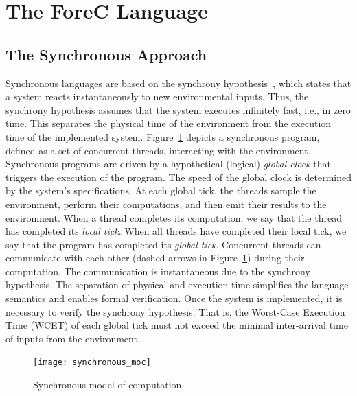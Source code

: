 \section{The ForeC Language}
\label{sec:forecLanguage}


\subsection{The Synchronous Approach}
Synchronous languages are based on the synchrony hypothesis~\cite{timed_synchronous_survey},
which states that a system reacts instantaneously to new environmental
inputs. Thus, the synchrony hypothesis assumes that the system 
executes infinitely fast, i.e., in zero time. This separates the physical 
time of the environment from the execution time of the implemented system. 
Figure~\ref{fig:synchronous_moc} depicts a synchronous 
program, defined as a set of concurrent threads, interacting with the 
environment. Synchronous programs are driven by a hypothetical (logical)
\emph{global clock} that triggers the execution of the program. The speed 
of the global clock is determined by the system's specifications. At each
global tick, the threads sample the environment, perform their computations,
and then emit their results to the environment. When a thread completes 
its computation, we say that the thread has completed its \emph{local tick}.
When all threads have completed their local tick, we say that the program
has completed its \emph{global tick}.
Concurrent threads can communicate with each other (dashed 
arrows in Figure~\ref{fig:synchronous_moc}) during their
computation. The communication is instantaneous due to 
the synchrony hypothesis.   
The separation of physical and execution time simplifies 
the language semantics and enables formal verification. Once the 
system is implemented, it is necessary to verify the synchrony 
hypothesis. That is, the Worst-Case Execution Time (WCET) of each 
global tick must not exceed the minimal inter-arrival time of inputs
from the environment.

\begin{figure}
	\centering
	\texttt{[image: synchronous\_moc]}	

	\caption{Synchronous model of computation.}
	\label{fig:synchronous_moc}
\end{figure}

